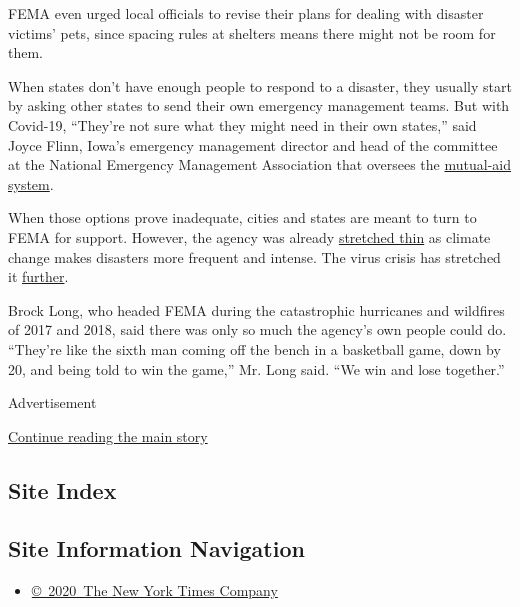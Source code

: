 FEMA even urged local officials to revise their plans for dealing with
disaster victims' pets, since spacing rules at shelters means there
might not be room for them.

When states don't have enough people to respond to a disaster, they
usually start by asking other states to send their own emergency
management teams. But with Covid-19, ``They're not sure what they might
need in their own states,'' said Joyce Flinn, Iowa's emergency
management director and head of the committee at the National Emergency
Management Association that oversees the
\href{https://www.bloomberg.com/news/articles/2017-10-06/fewer-states-sent-help-to-puerto-rico-than-to-texas-or-florida?sref=UBrhZ1ro}{mutual-aid
system}.

When those options prove inadequate, cities and states are meant to turn
to FEMA for support. However, the agency was already
\href{https://www.gao.gov/products/GAO-20-360}{stretched thin} as
climate change makes disasters more frequent and intense. The virus
crisis has stretched it
\href{https://www.nytimes3xbfgragh.onion/2020/04/03/climate/fema-staff-shortage-coronavirus.html}{further}.

Brock Long, who headed FEMA during the catastrophic hurricanes and
wildfires of 2017 and 2018, said there was only so much the agency's own
people could do. ``They're like the sixth man coming off the bench in a
basketball game, down by 20, and being told to win the game,'' Mr. Long
said. ``We win and lose together.''

Advertisement

\protect\hyperlink{after-bottom}{Continue reading the main story}

\hypertarget{site-index}{%
\subsection{Site Index}\label{site-index}}

\hypertarget{site-information-navigation}{%
\subsection{Site Information
Navigation}\label{site-information-navigation}}

\begin{itemize}
\tightlist
\item
  \href{https://help.nytimes3xbfgragh.onion/hc/en-us/articles/115014792127-Copyright-notice}{©~2020~The
  New York Times Company}
\end{itemize}

